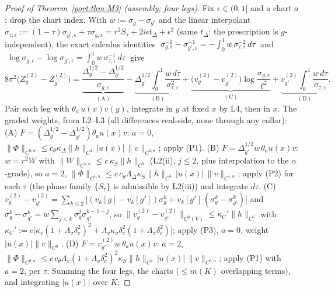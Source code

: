 \begin{proof}[Proof of Theorem~\ref{port:thm-M3} (assembly; four legs)]
Fix $\epsilon\in(0,1]$ and a chart $a$; drop the chart index. With
$w:=\sigma_g-\sigma_{g'}$ and the linear interpolant
$\sigma_{\tau,\epsilon}:=(1-\tau)\sigma_{g',\epsilon}
+\tau\sigma_{g,\epsilon}=r^2S_\tau+2i\epsilon t_\Delta+\epsilon^2$
(same $t_\Delta$: the prescription is $g$-independent), the exact
calculus identities
$\;\sigma_{g,\epsilon}^{-1}-\sigma_{g',\epsilon}^{-1}
=-\int_0^1 w\,\sigma_{\tau,\epsilon}^{-2}\,d\tau\;$ and
$\;\log\sigma_{g,\epsilon}-\log\sigma_{g',\epsilon}
=\int_0^1 w\,\sigma_{\tau,\epsilon}^{-1}\,d\tau\;$ give
\[
  8\pi^2\bigl(Z^{(2)}_g-Z^{(2)}_{g'}\bigr)
  =\underbrace{\frac{\Delta^{1/2}_g-\Delta^{1/2}_{g'}}
  {\sigma_{g,\epsilon}}}_{\mathrm{(A)}}
  -\underbrace{\Delta^{1/2}_{g'}\!\int_0^1\!
  \frac{w\,d\tau}{\sigma_{\tau,\epsilon}^{2}}}_{\mathrm{(B)}}
  +\underbrace{\bigl(v^{(2)}_g-v^{(2)}_{g'}\bigr)
  \log\frac{\sigma_{g,\epsilon}}{\ell^2}}_{\mathrm{(C)}}
  +\underbrace{v^{(2)}_{g'}\!\int_0^1\!
  \frac{w\,d\tau}{\sigma_{\tau,\epsilon}}}_{\mathrm{(D)}} .
\]
Pair each leg with $\theta_a\,u(x)v(y)$, integrate in $y$ at fixed $x$
by L4, then in $x$. The graded weights, from L2--L3 (all differences
real-side, none through any collar):
(A) $F=(\Delta^{1/2}_g-\Delta^{1/2}_{g'})\theta_a u(x)v$: $a=0$,
$\|\Phi\|_{C^{0,\alpha}}\le c_\theta\kappa_\Delta\|h\|_{C^4}
\,|u(x)|\,\|v\|_{C^{0,\alpha}}$; apply (P1).
(B) $F=\Delta^{1/2}_{g'}w\,\theta_a u(x)v$: $w=r^2W$ with
$\|W\|_{C^{1,\alpha}}\le c\,\kappa_S\|h\|_{C^{3}}$ (L2(ii), $j\le2$,
plus interpolation to the $\alpha$-grade), so $a=2$,
$\|\Phi\|_{C^{1,\alpha}}\le c\,c_\theta\Lambda_\Delta\kappa_S
\|h\|_{C^3}\,|u(x)|\,\|v\|_{C^{1,\alpha}}$; apply (P2) for each
$\tau$ (the phase family $\{S_\tau\}$ is admissible by L2(iii)) and
integrate $d\tau$.
(C) $v^{(2)}_g-v^{(2)}_{g'}=\sum_{k\le2}\bigl[(v_k[g]-v_k[g'])
\sigma_g^k+v_k[g']\,(\sigma_g^k-\sigma_{g'}^k)\bigr]$ and
$\sigma_g^k-\sigma_{g'}^k=w\sum_{j<k}\sigma_g^j\sigma_{g'}^{k-1-j}$,
so $\|v^{(2)}_g-v^{(2)}_{g'}\|_{C^0(V)}\le
\kappa_C'\|h\|_{C^6}$ with
$\kappa_C':=c\bigl[\kappa_v(1+\Lambda_\sigma\delta_c^2)^2
+\Lambda_v\kappa_\sigma\delta_c^2(1+\Lambda_\sigma\delta_c^2)\bigr]$;
apply (P3), $a=0$, weight $|u(x)|\|v\|_{C^0}$.
(D) $F=v^{(2)}_{g'}w\,\theta_a u(x)v$: $a=2$,
$\|\Phi\|_{C^{0,\alpha}}\le c\,c_\theta\Lambda_v
(1+\Lambda_\sigma\delta_c^2)^2\kappa_S\|h\|_{C^2}\,|u(x)|
\,\|v\|_{C^{0,\alpha}}$; apply (P1) with $a=2$, per $\tau$.
Summing the four legs, the charts ($\le m(K)$ overlapping terms), and
integrating $|u(x)|$ over $K$:

\end{proof}
